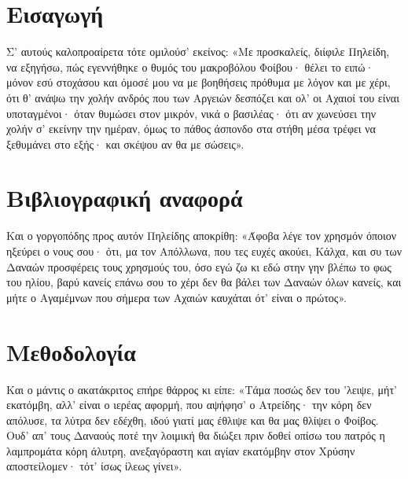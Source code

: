 \documentclass[12pt,a4paper]{article}
\begin{document}
\newpage



\tableofcontents
{}
\newpage
\setcounter{page}{1}

\section{Εισαγωγή}\label{sec:intro}

Σ' αυτούς καλοπροαίρετα τότε ομιλούσ' εκείνος:
«Με προσκαλείς, διίφιλε Πηλείδη, να εξηγήσω,
πώς εγεννήθηκε ο θυμός του μακροβόλου Φοίβου·
θέλει το ειπώ· μόνον εσύ στοχάσου και όμοσέ μου
να με βοηθήσεις πρόθυμα με λόγον και με χέρι,
ότι θ' ανάψω την χολήν ανδρός που των Αργειών
δεσπόζει και ολ' οι Αχαιοί του είναι υποταγμένοι·
όταν θυμώσει στον μικρόν, νικά ο βασιλέας·
ότι αν χωνεύσει την χολήν σ' εκείνην την ημέραν,
όμως το πάθος άσπονδο στα στήθη μέσα τρέφει
να ξεθυμάνει στο εξής· και σκέψου αν θα με σώσεις». \cite{iliada}

\section{Βιβλιογραφική αναφορά}\label{sec:lit-rev}

Και ο γοργοπόδης προς αυτόν Πηλείδης αποκρίθη:
«Άφοβα λέγε τον χρησμόν όποιον ηξεύρει ο νους σου·
ότι, μα τον Απόλλωνα, που τες ευχές ακούει,
Κάλχα, και συ των Δαναών προσφέρεις τους χρησμούς του,
όσο εγώ ζω κι εδώ στην γην βλέπω το φως του ηλίου,
βαρύ κανείς επάνω σου το χέρι δεν θα βάλει
των Δαναών όλων κανείς, και μήτε ο Αγαμέμνων
που σήμερα των Αχαιών καυχάται ότ' είναι ο πρώτος».\cite{latexcompanion}

\section{Μεθοδολογία}\label{sec:meth}

Και ο μάντις ο ακατάκριτος επήρε θάρρος κι είπε:
«Τάμα ποσώς δεν του 'λειψε, μήτ' εκατόμβη, αλλ' είναι
ο ιερέας αφορμή, που αψήφησ' ο Ατρείδης·
την κόρη δεν απόλυσε, τα λύτρα δεν εδέχθη,
ιδού γιατί μας έθλιψε και θα μας θλίψει ο Φοίβος.
Ουδ' απ' τους Δαναούς ποτέ την λοιμική θα διώξει
πριν δοθεί οπίσω του πατρός η λαμπρομάτα κόρη
άλυτρη, ανεξαγόραστη και αγίαν εκατόμβην
στον Χρύσην αποστείλομεν· τότ' ίσως ίλεως γίνει».
\end{document}
